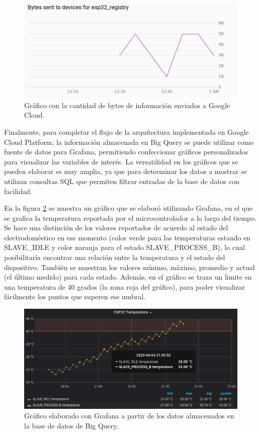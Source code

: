 \begin{figure}[h]
\centering
\includegraphics[width=\textwidth]{./Figures/gcloud_bytes_sent.png}
\caption{Gráfico con la cantidad de bytes de información enviados a Google Cloud.}
\label{fig:gcloud_bytes_sent}
\end{figure}

Finalmente, para completar el flujo de la arquitectura implementada en Google Cloud Platform, la información almacenada en Big Query se puede utilizar como fuente de datos para Grafana, permitiendo confeccionar gráficos personalizados para visualizar las variables de interés. La versatilidad en los gráficos que se pueden elaborar es muy amplia, ya que para determinar los datos a mostrar se utilizan consultas SQL que permiten filtrar entradas de la base de datos con facilidad.

En la figura \ref{fig:gcloud_grafana} se muestra un gráfico que se elaboró utilizando Grafana, en el que se grafica la temperatura reportada por el microcontrolador a lo largo del tiempo. Se hace una distinción de los valores reportados de acuerdo al estado del electrodoméstico en ese momento (color verde para las temperaturas estando en SLAVE\_IDLE y color naranja para el estado SLAVE\_PROCESS\_B), lo cual posibilitaría encontrar una relación entre la temperatura y el estado del dispositivo. También se muestran los valores mínimo, máximo, promedio y actual (el último medido) para cada estado. Además, en el gráfico se traza un limite en una temperatura de 40 grados (la zona roja del gráfico), para poder visualizar fácilmente los puntos que superen ese umbral.

\begin{figure}[h]
\centering
\includegraphics[width=\textwidth]{./Figures/gcloud_grafana.png}
\caption{Gráfico elaborado con Grafana a partir de los datos almacenados en la base de datos de Big Query.}
\label{fig:gcloud_grafana}
\end{figure}

